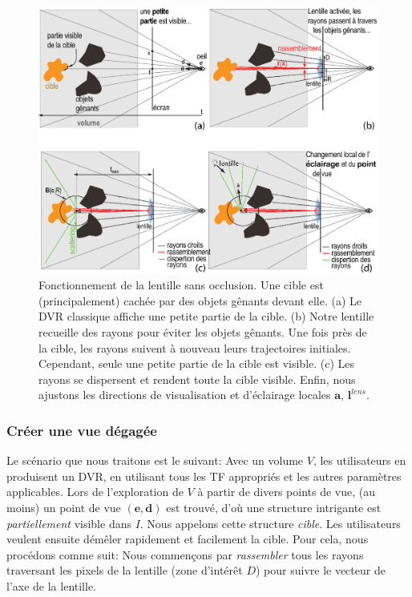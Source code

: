 \begin{figure}
\centering

\includegraphics [width=\textwidth]{images/principlefr.eps}

\caption[Fonctionnement de la lentille sans occlusion]{Fonctionnement de la lentille sans occlusion. Une cible est (principalement) cachée par des objets gênants devant elle. (a) Le DVR classique affiche une petite partie de la cible. (b) Notre lentille recueille des rayons pour éviter les objets gênants. Une fois près de la cible, les rayons suivent à nouveau leurs trajectoires initiales. Cependant, seule une petite partie de la cible est visible. (c) Les rayons se dispersent et  rendent toute la cible visible. Enfin, nous ajustons les directions de visualisation et d'éclairage locales $\mathbf{a}$, $\mathbf{l}^{lens}$.}
\label{f:fisheyefr}

\end{figure}



\subsubsection{Créer une vue dégagée}

Le scénario que nous traitons est le suivant: Avec un volume $ V $, les utilisateurs en produisent un DVR, en utilisant tous les TF appropriés et les autres paramètres applicables. Lors de l'exploration de $V$ à partir de divers points de vue, (au moins) un point de vue $ (\mathbf{e}, \mathbf{d}) $ est trouvé, d'où une structure intrigante est \emph{partiellement} visible dans $ I $. Nous appelons cette structure \emph{cible}. Les utilisateurs veulent ensuite démêler rapidement et facilement la cible. Pour cela, nous procédons comme suit: Nous commençons par \emph{rassembler} tous les rayons traversant les pixels de la lentille (zone d'intérêt $ D $) pour suivre le vecteur de l'axe de la lentille.

